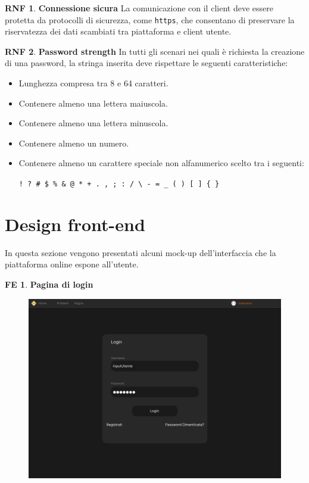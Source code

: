 \documentclass[11pt, a4paper]{article}
\theoremstyle{definition}
\newtheorem{nonfuncreq}{RNF} %
\newtheorem{frontend}{FE}
\begin{document}
\begin{nonfuncreq}
\textbf{Connessione sicura }
La comunicazione con il client deve essere protetta da protocolli
di sicurezza, come \texttt{https}, che consentano di preservare la
riservatezza dei dati scambiati tra piattaforma e client utente.
\end{nonfuncreq}

\begin{nonfuncreq}
\label{legalpassword}
\textbf{Password strength }
In tutti gli scenari nei quali è richiesta la creazione di una password,
la stringa inserita deve rispettare le seguenti caratteristiche:
\begin{itemize}
    \item Lunghezza compresa tra 8 e 64 caratteri.
    \item Contenere almeno una lettera maiuscola.
    \item Contenere almeno una lettera minuscola.
    \item Contenere almeno un numero.
    \item Contenere almeno un carattere speciale non alfanumerico
    scelto tra i seguenti:
    \begin{center}
        \verb|! ? # $ % & @ * + . , ; : / \ - = _ ( ) [ ] { }|
    \end{center}
\end{itemize}
\end{nonfuncreq}


\newpage
\section{Design front-end}
In questa sezione vengono presentati alcuni mock-up dell'interfaccia che
la piattaforma online espone all'utente.

\begin{frontend}
\textbf{Pagina di login }
\end{frontend}
\begin{figure}[H]
\centering
\includegraphics[scale=0.22]{materiale/immaginife/login.jpeg}
\end{figure}
\end{document}
